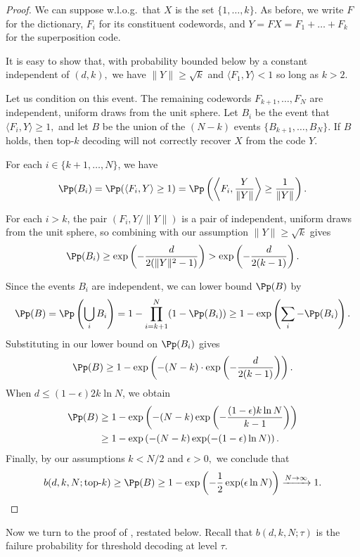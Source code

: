 \begin{proof}
We can suppose w.l.o.g.\ that $X$ is the set $\{1, \dots, k \}.$ As before, we write $F$ for the dictionary, $F_i$ for its constituent codewords, and $Y = F X = F_1 + \dots + F_k$ for the superposition code.

It is easy to show that, with probability bounded below by a constant independent of $(d, k),$ we have $\lVert Y \rVert \ge \sqrt k$ and $\langle F_1, Y \rangle < 1$ so long as $k > 2.$

Let us condition on this event. The remaining codewords $F_{k + 1}, \dots, F_N$ are independent, uniform draws from the unit sphere. Let $B_i$ be the event that $\langle F_i, Y \rangle \ge 1,$ and let $B$ be the union of the $(N - k)$ events $\{B_{k + 1}, \dots, B_N \}.$ If $B$ holds, then top-$k$ decoding will not correctly recover $X$ from the code $Y.$

For each $i \in \{k+1, \dots, N\}$, we have
$$\Pp(B_i) = \Pp(\langle F_i, Y \rangle \ge 1) = \Pp\left(\left\langle F_i, \frac{Y}{\lVert Y \rVert} \right\rangle \ge \frac{1}{\lVert Y \rVert}\right).$$

For each $i > k$, the pair $(F_i, Y / \lVert Y \rVert)$ is a pair of independent, uniform draws from the unit sphere, so combining  with our assumption $\lVert Y \rVert \ge \sqrt k$ gives
$$\Pp(B_i) \ge \exp\left(-\frac{d}{2(\lVert Y \rVert^2 - 1)}\right) > \exp\left(-\frac{d}{2(k - 1)}\right).$$

Since the events $B_i$ are independent, we can lower bound $\Pp(B)$ by
$$
\Pp(B) = \Pp\left( \bigcup_i B_i \right) = 1 - \prod_{i = k + 1}^N (1 - \Pp(B_i)) \ge 1 - \exp \left( \sum_i -\Pp(B_i) \right).
$$
Substituting in our lower bound on $\Pp(B_i)$ gives
$$\Pp(B) \ge 1 - \exp\left(-(N - k) \cdot \exp\left(-\frac{d}{2(k-1)}\right)\right).$$
When $d \le (1 - \epsilon) 2k \ln N$, we obtain
\begin{align*}
\Pp(B)
&\ge 1 - \exp\left(-(N - k) \exp\left(-\frac{(1-\epsilon) k \ln N}{k-1}\right)\right)\\
&\ge 1 - \exp\left(-(N - k) \exp(-(1 - \epsilon) \ln N)\right).
\end{align*}
Finally, by our assumptions $k < N/2$ and $\epsilon > 0,$ we conclude that
$$
b(d, k, N; \text{top-}k) \ge \Pp(B) \ge 1 - \exp\left(- \frac 1 2 \exp(\epsilon \ln N) \right) \xrightarrow{N \to \infty} 1.
$$
\end{proof}

Now we turn to the proof of , restated below. Recall that $b(d, k, N; \tau)$ is the failure probability for threshold decoding at level $\tau.$

